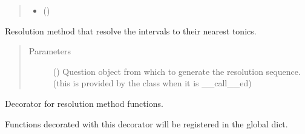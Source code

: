 \documentclass[letterpaper,10pt,english]{sphinxmanual}
\begin{document}
\begin{fulllineitems}
\begin{fulllineitems}
\begin{quote}
\begin{description}
\begin{itemize}
\item {} 
\sphinxAtStartPar
{} () \textendash{} 

\end{itemize}

\end{description}\end{quote}

\end{fulllineitems}


\end{fulllineitems}


\begin{fulllineitems}
\label{\detokenize{birdears:birdears.resolution.nearest_tonic}}
\sphinxAtStartPar
Resolution method that resolve the intervals to their nearest tonics.
\begin{quote}\begin{description}
\item[{Parameters}] \leavevmode
\sphinxAtStartPar
{} () \textendash{} Question object from which to generate the
resolution sequence. (this is provided by the  class
when it is {\color{red}\bfseries{}\textasciigrave{}}\_\_call\_\_\textasciigrave{}ed)

\end{description}\end{quote}

\end{fulllineitems}


\begin{fulllineitems}
\label{\detokenize{birdears:birdears.resolution.register_resolution_method}}
\sphinxAtStartPar
Decorator for resolution method functions.

\sphinxAtStartPar
Functions decorated with this decorator will be registered in the
 global dict.

\end{fulllineitems}
\end{document}
